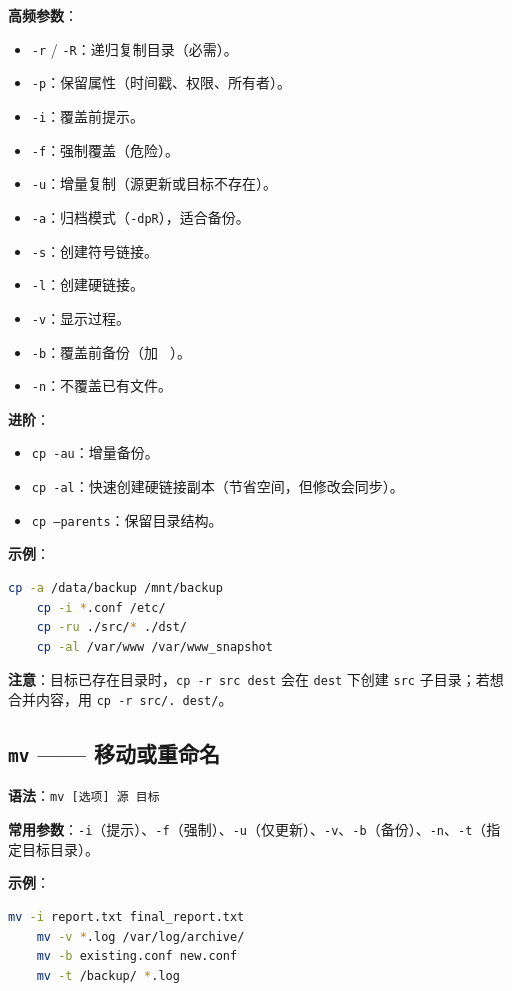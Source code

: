 \textbf{高频参数}：
\begin{itemize}
\item \texttt{-r} / \texttt{-R}：递归复制目录（必需）。
\item \texttt{-p}：保留属性（时间戳、权限、所有者）。
\item \texttt{-i}：覆盖前提示。
\item \texttt{-f}：强制覆盖（危险）。
\item \texttt{-u}：增量复制（源更新或目标不存在）。
\item \texttt{-a}：归档模式（\texttt{-dpR}），适合备份。
\item \texttt{-s}：创建符号链接。
\item \texttt{-l}：创建硬链接。
\item \texttt{-v}：显示过程。
\item \texttt{-b}：覆盖前备份（加 \texttt{\string~}）。
\item \texttt{-n}：不覆盖已有文件。
\end{itemize}

\textbf{进阶}：
\begin{itemize}
\item \texttt{cp -au}：增量备份。
\item \texttt{cp -al}：快速创建硬链接副本（节省空间，但修改会同步）。
\item \texttt{cp --parents}：保留目录结构。
\end{itemize}

\textbf{示例}：
\begin{lstlisting}[language=bash]
	cp -a /data/backup /mnt/backup
	cp -i *.conf /etc/
	cp -ru ./src/* ./dst/
	cp -al /var/www /var/www_snapshot
\end{lstlisting}

\textbf{注意}：目标已存在目录时，\texttt{cp -r src dest} 会在 \texttt{dest} 下创建 \texttt{src} 子目录；若想合并内容，用 \texttt{cp -r src/. dest/}。

\subsection{\texttt{mv} —— 移动或重命名} \textbf{语法}：\texttt{mv [选项] 源 目标}

\textbf{常用参数}：\texttt{-i}（提示）、\texttt{-f}（强制）、\texttt{-u}（仅更新）、\texttt{-v}、\texttt{-b}（备份）、\texttt{-n}、\texttt{-t}（指定目标目录）。

\textbf{示例}：
\begin{lstlisting}[language=bash]
	mv -i report.txt final_report.txt
	mv -v *.log /var/log/archive/
	mv -b existing.conf new.conf
	mv -t /backup/ *.log
\end{lstlisting}

